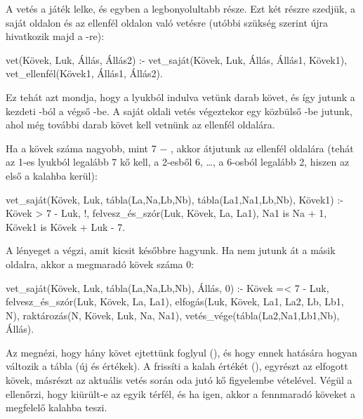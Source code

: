A vetés a játék lelke, és egyben a legbonyolultabb
része. Ezt két részre szedjük, a saját oldalon és az
ellenfél oldalon való vetésre (utóbbi szükség
szerint újra hivatkozik majd a -re):
\begin{program}
vet(Kövek, Luk, Állás, Állás2) :-
    vet_saját(Kövek, Luk, Állás, Állás1, Kövek1),
    vet_ellenfél(Kövek1, Állás1, Állás2).
\end{program}

Ez tehát azt mondja, hogy a  lyukból indulva
vetünk  darab követ, és így jutunk a
kezdeti -ból a végső -be. A
saját oldali vetés végeztekor egy közbülső
-be jutunk, ahol még további 
darab követ kell vetnünk az ellenfél oldalára.

Ha a kövek száma nagyobb, mint 7 $-$ , akkor
átjutunk az ellenfél oldalára (tehát az 1-es lyukból
legalább 7 kő kell, a 2-esből 6, \dots, a 6-osból
legalább 2, hiszen az első a kalahba kerül):
\begin{program}
vet_saját(Kövek, Luk, tábla(La,Na,Lb,Nb),
          tábla(La1,Na1,Lb,Nb), Kövek1) :-
    Kövek > 7 - Luk, !, %
    felvesz_és_szór(Luk, Kövek, La, La1),
    Na1 is Na + 1, Kövek1 is Kövek + Luk - 7.
\end{program}

A lényeget a  végzi, amit
kicsit későbbre hagyunk. Ha nem jutunk át a másik
oldalra, akkor a megmaradó kövek száma 0:
\begin{program}
vet_saját(Kövek, Luk,
          tábla(La,Na,Lb,Nb), Állás, 0) :-
    Kövek =< 7 - Luk,
    felvesz_és_szór(Luk, Kövek, La, La1),
    elfogás(Luk, Kövek, La1, La2, Lb, Lb1, N),
    raktározás(N, Kövek, Luk, Na, Na1),
    vetés_vége(tábla(La2,Na1,Lb1,Nb), Állás).
\end{program}

Az  megnézi, hogy hány követ ejtettünk
foglyul (), és hogy ennek hatására hogyan
változik a tábla (új  és 
értékek). A  frissíti a kalah értékét
(), egyrészt az elfogott kövek, másrészt az
aktuális vetés során oda jutó kő figyelembe
vételével. Végül a  ellenőrzi, hogy
kiürült-e az egyik térfél, és ha igen, akkor a
fennmaradó köveket a megfelelő kalahba teszi.


